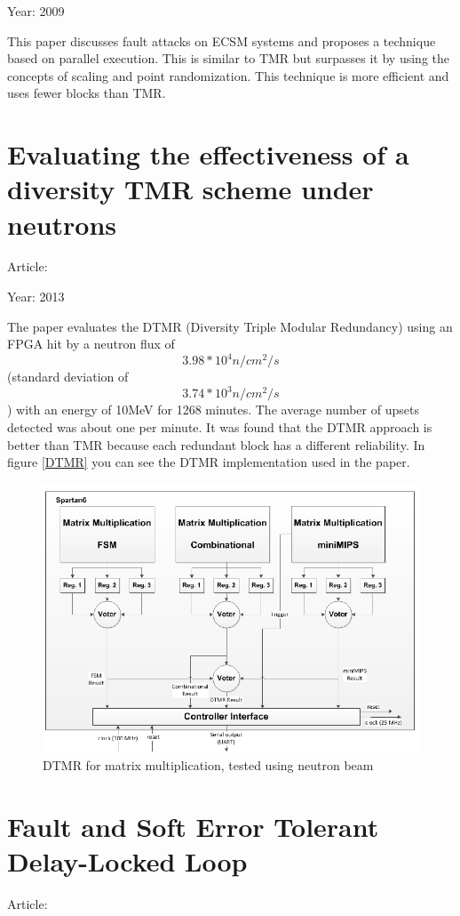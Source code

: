 {{		Year: 2009
		
		This paper discusses fault attacks on ECSM systems and proposes a technique based on parallel execution. This is similar to TMR but surpasses it by using the concepts of scaling and point randomization. This technique is more efficient and uses fewer blocks than TMR.
	}
	\section{Evaluating the effectiveness of a diversity TMR scheme under neutrons}{
		Article: \cite{Evaluating_the_effectiveness_of_a_diversity_TMR_scheme_under_neutrons}
		
		Year: 2013
		
		The paper evaluates the DTMR (Diversity Triple Modular Redundancy) using an FPGA hit by a neutron flux of \[3.98*10^4 n/cm^2/s\] (standard deviation of \[3.74*10^3 n/cm^2/s\]) with an energy of 10MeV for 1268 minutes. The average number of upsets detected was about one per minute. It was found that the DTMR approach is better than TMR because each redundant block has a different reliability. In figure \ref{DTMR} you can see the DTMR implementation used in the paper.
		\begin{figure}[H]
			\centering
			\includegraphics[scale=0.5]{./images/Articles_image/Evaluating_the_effectiveness_of_a_diversity_TMR_scheme_under_neutrons_DTMR.png}
			\caption{DTMR for matrix multiplication, tested using neutron beam}
			\label{fig:DTMR}
		\end{figure}			
	}
	\section{Fault and Soft Error Tolerant Delay-Locked Loop}{
		Article: \cite{Fault_and_Soft_Error_Tolerant_Delay-Locked_Loop}
		
}}
